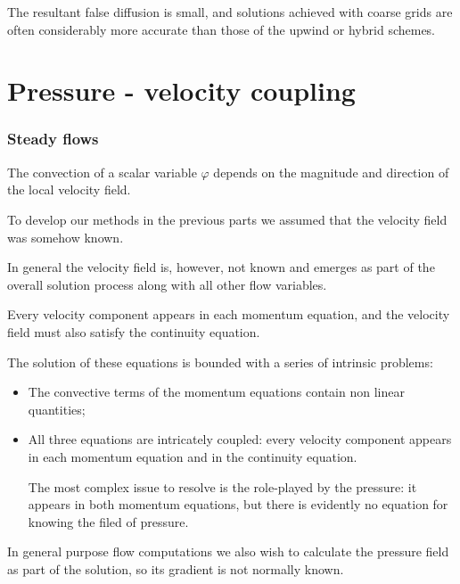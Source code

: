 \documentclass[a4paper, 15pt]{article}
\begin{document}
The resultant false diffusion is small, and
solutions achieved with coarse grids are often considerably more accurate than those of the
upwind or hybrid schemes. 

\newpage
\part{Pressure - velocity coupling}
\section{Steady flows}

The
convection of a scalar variable $\varphi$ depends on the magnitude and direction of the local
velocity field.

To develop our methods in the previous parts we assumed that the velocity field
was somehow known. \newline 


In
general the velocity field is, however, not known and emerges as part of the overall solution
process along with all other flow variables. \newline 

Every
velocity component appears in each momentum equation, and the velocity field must also
satisfy the continuity equation. \newline 

The
solution of these equations is bounded with a series of intrinsic problems:
\begin{itemize}
	\item The
	convective terms of the momentum equations contain non linear quantities; 
	
	\item All
	three equations are intricately coupled: every velocity component appears in each
	momentum equation and in the continuity equation. \newline 
	
	The most complex issue to resolve is the
	role-played by the pressure: it appears in both momentum equations, but there is evidently no equation for knowing the filed of pressure.
\end{itemize}

In
general purpose flow computations we also wish to calculate the pressure field as part of the
solution, so its gradient is not normally known. \newline 
\end{document}
